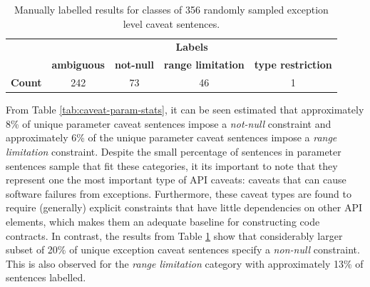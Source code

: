 \begin{table}[]
	\begin{tabular}{|l|cccc|}
		\hline
		& \multicolumn{4}{c|}{\textbf{Labels}} \\ \cline{2-5} 
		& \textbf{ambiguous} & \textbf{not-null} & \textbf{range limitation} & \textbf{type restriction} \\ \hline
		\textbf{Count} & 242 & 73 & 46 & 1 \\ \hline
	\end{tabular}
	\caption{Manually labelled results for classes of 356 randomly sampled exception level caveat sentences.}
	\label{tab:caveat-exception-stats}
\end{table}

From Table \ref{tab:caveat-param-stats}, it can be seen estimated that approximately 8\% of unique parameter caveat sentences impose a \textit{not-null} constraint and approximately 6\% of the unique parameter caveat sentences impose a \textit{range limitation} constraint. Despite the small percentage of sentences in parameter sentences sample that fit these categories, it its important to note that they represent one the most important type of API caveats: caveats that can cause software failures from exceptions. Furthermore, these caveat types are found to require (generally) explicit constraints that have little dependencies on other API elements, which makes them an adequate baseline for constructing code contracts. In contrast, the results from Table \ref{tab:caveat-exception-stats} show that considerably larger subset of 20\% of unique exception caveat sentences specify a \textit{non-null} constraint. This is also observed for the \textit{range limitation} category with approximately 13\% of sentences labelled. \\

